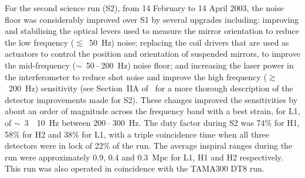 \documentclass{article}
\newcommand{\Hz}{Hz\super{-1/2}\xspace}
\begin{document}

For the second science run (S2), from 14 February to 14 April 2003, the noise
floor was considerably improved over S1 by several upgrades including: improving
and stabilising the optical levers used to measure the mirror orientation to
reduce the low frequency ($\lesssim$~50~Hz) noise; replacing the coil drivers
that are used as actuators to control the position and orientation of suspended
mirrors, to improve the mid-frequency ($\sim$~50\,--\,200~Hz) noise floor; and
increasing the laser power in the interferometer to reduce shot noise and
improve the high frequency ($\gtrsim$~200~Hz) sensitivity (see
Section~IIA of~\cite{Abbott:2005a} for a more thorough description of
the detector improvements made for S2). These changes improved the
sensitivities by about an order of magnitude across the frequency band
with a best strain, for L1, of $\sim$~3~\texttimes~10~\Hz
between 200\,--\,300~Hz. The duty factor during S2 was 74\% for H1,
58\% for H2 and 38\% for L1, with a triple coincidence time when all
three detectors were in lock of 22\% of the run. The average inspiral
ranges during the run were approximately 0.9, 0.4 and 0.3~Mpc for L1,
H1 and H2 respectively. This run was also operated in coincidence with
the TAMA300 DT8 run. 
\end{document}
